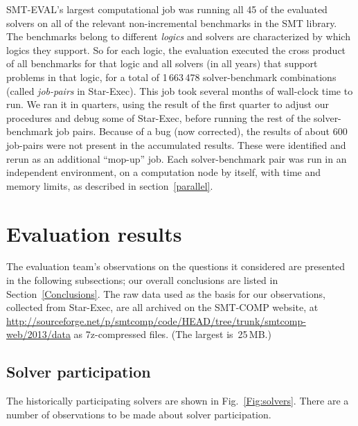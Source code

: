\documentclass[smallcondensed]{svjour3}
\begin{document}
SMT-EVAL's largest computational job was running all 45 of the evaluated solvers on all of the relevant non-incremental benchmarks in the SMT library. 
The benchmarks belong to different {\em logics} and solvers are characterized by which logics they support. 
So for each logic, the evaluation executed the cross product of all benchmarks for that logic and all solvers (in all years) that support problems in that logic, for a total of 1\,663\,478 solver-benchmark combinations (called {\em job-pairs} in Star-Exec). 
This job took several months of wall-clock time to run. 
We ran it in quarters, using the result of the first quarter to adjust our procedures and debug some of Star-Exec, before running the rest of the solver-benchmark job pairs. 
Because of a bug (now corrected), the results of about 600 job-pairs were not present in the accumulated results. 
These were identified and rerun as an additional ``mop-up'' job. 
Each solver-benchmark pair was run in an independent environment, on a computation node by itself, with time and memory limits, as described in section~\ref{parallel}.

\section{Evaluation results}
\label{Evaluations}

The evaluation team's observations on the questions it considered are presented in the following subsections; our overall conclusions are listed in Section~\ref{Conclusions}.  The raw data used as the basis for our observations, collected from Star-Exec, are all archived on the SMT-COMP website, at \url{http://sourceforge.net/p/smtcomp/code/HEAD/tree/trunk/smtcomp-web/2013/data} as 7z-compressed files.  (The largest is~25\,MB.)

\subsection{Solver participation}
\label{Solvers}

The historically participating solvers are shown in Fig.~\ref{Fig:solvers}. There are a number of observations to be made about solver participation.
   
\end{document}
